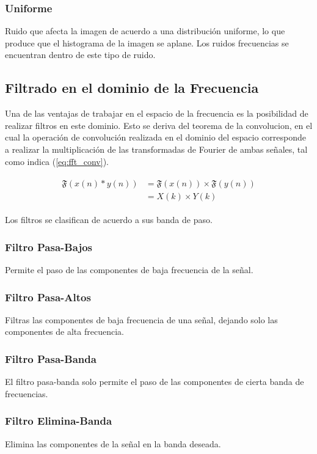 \documentclass[
  letterpaper,
  twocolumn,
  9pt,
  journal,
  final]{IEEEtran}
\begin{document}
\subsubsection{Uniforme}
Ruido que afecta la imagen de acuerdo a una distribución uniforme, lo que produce que el histograma de la imagen se aplane. Los ruidos frecuencias se encuentran dentro de este tipo de ruido.


\subsection{Filtrado en el dominio de la Frecuencia}

Una de las ventajas de trabajar en el espacio de la frecuencia es la posibilidad de realizar filtros en este dominio. Esto se deriva del teorema de la convolucion, en el cual la operación de convolución realizada en el dominio del espacio corresponde a realizar la multiplicación de las transformadas de Fourier de ambas señales, tal como indica (\ref{eq:fft_conv}).

\begin{align}
	\begin{split}
	\mathfrak{F} (x(n) * y(n) ) &= \mathfrak{F}(x(n)) \times \mathfrak{F}(y(n))\\
	&= X(k) \times Y(k)
	\end{split}\label{eq:fft_conv}
\end{align}


Los filtros se clasifican de acuerdo a sus banda de paso.

\subsubsection{Filtro Pasa-Bajos}
Permite el paso de las componentes de baja frecuencia de la señal.

\subsubsection{Filtro Pasa-Altos}
Filtras las componentes de baja frecuencia de una señal, dejando solo las componentes de alta frecuencia.

\subsubsection{Filtro Pasa-Banda} El filtro pasa-banda solo permite el paso de las componentes de cierta banda de frecuencias.

\subsubsection{Filtro Elimina-Banda} Elimina las componentes de la señal en la banda deseada.
\end{document}
